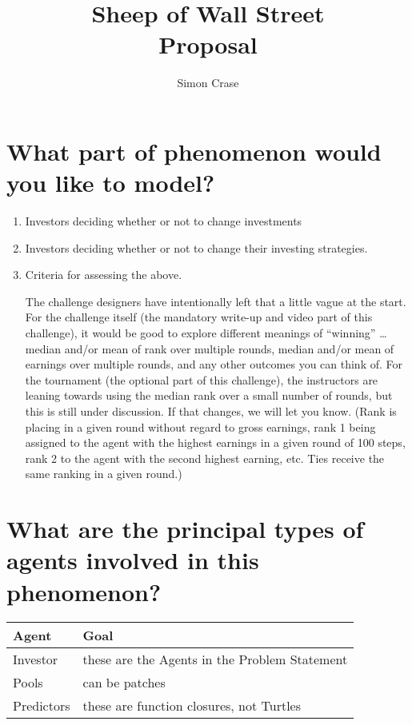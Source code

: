 \documentclass[]{article}
\title{Sheep of Wall Street\\Proposal}
\author{Simon Crase}
\begin{document}
\maketitle

\begin{abstract}

\end{abstract}


 
\section{What part of phenomenon would you like to model?}

\begin{enumerate}
	\item Investors deciding whether or not to change investments\cite{Challenge:2018}
	\item Investors deciding whether or not to change their investing strategies.
	\item Criteria for assessing the above.
	
	The challenge designers have intentionally left that a little vague at the start. For the challenge itself (the mandatory write-up and video part of this challenge), it would be good to explore different meanings of “winning” … median and/or mean of rank over multiple rounds, median and/or mean of earnings over multiple rounds, and any other outcomes you can think of. For the tournament (the optional part of this challenge), the instructors are leaning towards using the median rank over a small number of rounds, but this is still under discussion. If that changes, we will let you know. (Rank is placing in a given round without regard to gross earnings, rank 1 being assigned to the agent with the highest earnings in a given round of 100 steps, rank 2 to the agent with the second highest earning, etc. Ties receive the same ranking in a given round.)
\end{enumerate}
\section{What are the principal types of agents involved in this phenomenon?}

\begin{tabular}{|l|l|} \hline
	Agent&Goal\\ \hline
	Investor & these are the Agents in the Problem Statement\\ \hline
	Pools & can be patches\\ \hline
	Predictors &these are function closures, not Turtles \\ \hline
\end{tabular}
\end{document}
